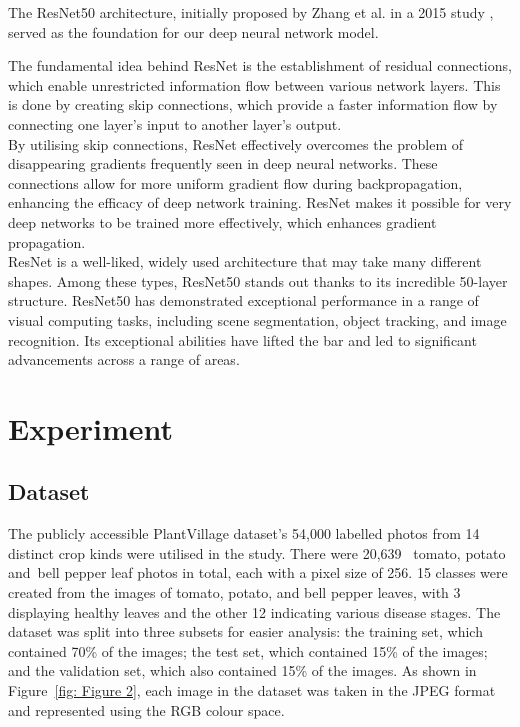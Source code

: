 \documentclass[conference]{IEEEtran}
\begin{document}
The ResNet50 architecture, initially proposed by Zhang et al. in a 2015 study \cite{Zhang_2021_WACV}, served as the foundation for our deep neural network model.

The fundamental idea behind ResNet is the establishment of residual connections, which enable unrestricted information flow between various network layers. This is done by creating skip connections, which provide a faster information flow by connecting one layer's input to another layer's output.\\

By utilising skip connections, ResNet effectively overcomes the problem of disappearing gradients frequently seen in deep neural networks. These connections allow for more uniform gradient flow during backpropagation, enhancing the efficacy of deep network training. ResNet makes it possible for very deep networks to be trained more effectively, which enhances gradient propagation.\\

ResNet is a well-liked, widely used architecture that may take many different shapes. Among these types, ResNet50 stands out thanks to its incredible 50-layer structure. ResNet50 has demonstrated exceptional performance in a range of visual computing tasks, including scene segmentation, object tracking, and image recognition. Its exceptional abilities have lifted the bar and led to significant advancements across a range of areas.

\section{Experiment}
\subsection{Dataset}
The publicly accessible PlantVillage dataset's 54,000 labelled photos from 14 distinct crop kinds were utilised in the study. There were 20,639  tomato, potato and bell pepper leaf photos in total, each with a pixel size of 256. 15 classes were created from the images of tomato, potato, and bell pepper leaves, with 3 displaying healthy leaves and the other 12 indicating various disease stages. The dataset was split into three subsets for easier analysis: the training set, which contained 70\% of the images; the test set, which contained 15\% of the images; and the validation set, which also contained 15\% of the images. As shown in Figure~\ref{fig: Figure 2}, each image in the dataset was taken in the JPEG format and represented using the RGB colour space.
\end{document}
